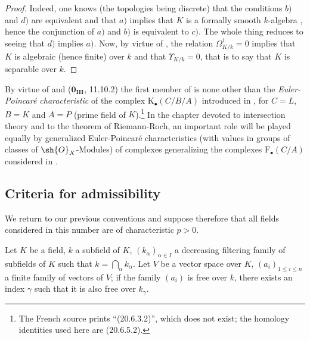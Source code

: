 \begin{proof}
Indeed, one knows (the topologies being discrete) that the conditions $b)$ and $d)$ are equivalent  and that $a)$ implies that $K$ is a formally smooth $k$-algebra , hence the conjunction of $a)$ and $b)$ is equivalent to $c)$.
The whole thing reduces to seeing that $d)$ implies $a)$.
Now, by virtue of , the relation $\Omega^1_{K/k}=0$ implies that $K$ is algebraic (hence finite) over $k$ and that $\Upsilon_{K/k}=0$, that is to say  that $K$ is separable over $k$.
\end{proof}

\begin{remark}[21.7.5]
\label{0.21.7.5}
By virtue of  and ($\mathbf{0_{III}}$, 11.10.2) the first member of  is none other than the \emph{Euler-Poincar\'e characteristic} of the complex $\mathrm{K}_\bullet(C/B/A)$ introduced in , for $C=L$, $B=K$ and $A=P$ (prime field of $K$).\footnote{The French source prints ``(20.6.3.2)'', which does not exist; the homology identities used here are (20.6.5.2).}
In the chapter devoted to intersection theory and to the theorem of Riemann-Roch, an important role will be played equally by generalized Euler-Poincar\'e characteristics (with values in groups of classes of $\sh{O}_X$-Modules) of complexes generalizing the complexes $\mathrm{F}_\bullet(C/A)$ considered in .
\end{remark}

\subsection{Criteria for admissibility}
\label{subsection:0.21.8}

We return to our previous conventions and suppose therefore that all fields considered in this number are of characteristic $p>0$.

\begin{lemma}[21.8.1]
\label{0.21.8.1}
Let $K$ be a field, $k$ a subfield of $K$, $(k_\alpha)_{\alpha\in I}$ a decreasing filtering family of subfields of $K$ such that $k=\bigcap_\alpha k_\alpha$.
Let $V$ be a vector space over $K$, $(a_i)_{1\leqslant i\leqslant n}$ a finite family of vectors of $V$; if the family $(a_i)$ is free over $k$, there exists an index $\gamma$ such that it is also free over $k_\gamma$.
\end{lemma}

